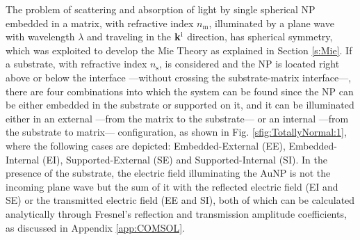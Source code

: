
The problem of scattering and absorption of light by single spherical NP embedded in a matrix, with refractive index $n_\text{m}$, illuminated by a plane wave with wavelength $\lambda$  and traveling in the  $\vb{k}^\text{i}$ direction, has spherical symmetry, which was exploited to develop the Mie Theory as explained in Section \ref{s:Mie}. If a substrate, with refractive index $n_\text{s}$, is considered and the NP is located right above or below the interface ---without crossing the substrate-matrix interface---, there are four combinations into which the system can be found since the NP can be either embedded  in the substrate or supported on it, and it can be illuminated either in an external ---from the matrix to the substrate--- or an internal ---from the substrate to matrix--- configuration, as shown in Fig. \ref{sfig:TotallyNormal:1}, where the following cases are depicted: Embedded-External (EE), Embedded-Internal (EI), Supported-External (SE) and Supported-Internal (SI). In the  presence of the substrate, the electric field illuminating the AuNP is not the incoming plane wave but the sum of it with the reflected electric field (EI and SE) or the transmitted electric field (EE and SI), both of which can be calculated analytically through Fresnel's reflection and transmission amplitude coefficients, as discussed in Appendix \ref{app:COMSOL}.

